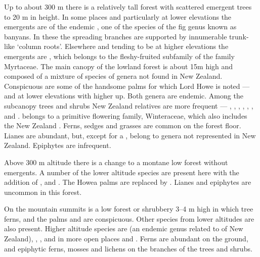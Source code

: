 Up to about 300 m there is a relatively tall forest with scattered emergent trees to 20 m in height.
In some places and particularly at lower elevations the emergents are of the endemic , one of the species of the fig genus known as banyans.
In these the spreading branches are supported by innumerable trunk-like `column roots'.
Elsewhere and tending to be at higher elevations the emergents are , which belongs to the fleshy-fruited subfamily of the family Myrtaceae.
The main canopy of the lowland forest is about 15m high and composed of a mixture of species of genera not found in New Zealand.
Conspicuous are some of the handsome palms for which Lord Howe is noted ---  and  at lower elevations with  higher up.
Both genera are endemic.
Among the subcanopy trees and shrubs New Zealand relatives are more frequent --- , , , , , ,  and .  belongs to a primitive flowering family, Winteraceae, which also includes the New Zealand .
Ferns, sedges and grasses are common on the forest floor.
Lianes are abundant, but, except for a , belong to genera not represented in New Zealand.
Epiphytes are infrequent.

Above 300 m altitude there is a change to a montane low forest without emergents.
A number of the lower altitude species are present here with the addition of ,  and .
The Howea palms are replaced by .
Lianes and epiphytes are uncommon in this forest.

On the mountain summits is a low forest or shrubbery 3–4 m high in which tree ferns,  and the palms  and  are conspicuous.
Other species from lower altitudes are also present.
Higher altitude species are  (an endemic genus related to  of New Zealand), , , and in more open places  and .
Ferns are abundant on the ground, and epiphytic ferns, mosses and lichens on the branches of the trees and shrubs.

